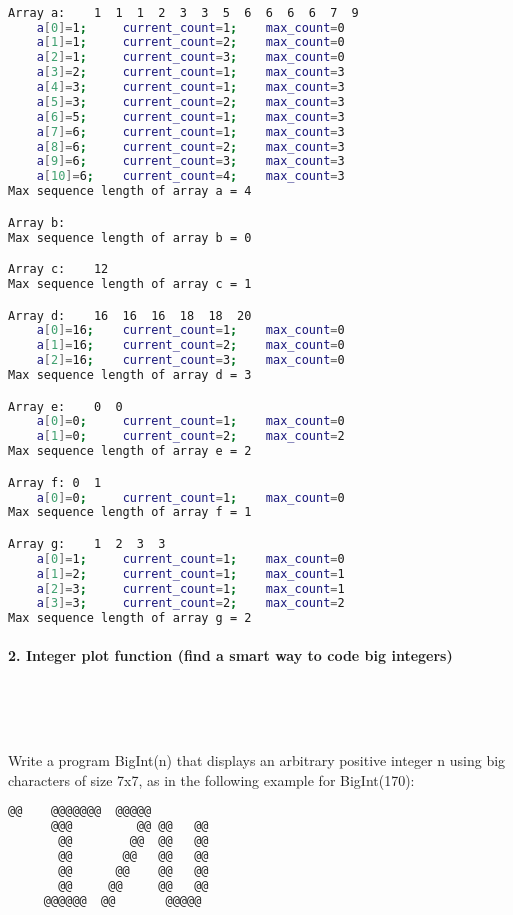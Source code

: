 \documentclass{article}
\begin{document}
	\ttfamily
	\begin{lstlisting}[language=bash]

Array a:    1  1  1  2  3  3  5  6  6  6  6  7  9
    a[0]=1; 	current_count=1; 	max_count=0
    a[1]=1; 	current_count=2; 	max_count=0
    a[2]=1; 	current_count=3; 	max_count=0
    a[3]=2; 	current_count=1; 	max_count=3
    a[4]=3; 	current_count=1; 	max_count=3
    a[5]=3; 	current_count=2; 	max_count=3
    a[6]=5; 	current_count=1; 	max_count=3
    a[7]=6; 	current_count=1; 	max_count=3
    a[8]=6; 	current_count=2; 	max_count=3
    a[9]=6; 	current_count=3; 	max_count=3
    a[10]=6; 	current_count=4; 	max_count=3
Max sequence length of array a = 4

Array b:
Max sequence length of array b = 0

Array c:    12
Max sequence length of array c = 1

Array d:    16  16  16  18  18  20
    a[0]=16; 	current_count=1; 	max_count=0
    a[1]=16; 	current_count=2; 	max_count=0
    a[2]=16; 	current_count=3; 	max_count=0
Max sequence length of array d = 3

Array e:    0  0
    a[0]=0; 	current_count=1; 	max_count=0
    a[1]=0; 	current_count=2; 	max_count=2
Max sequence length of array e = 2

Array f: 0  1
    a[0]=0; 	current_count=1; 	max_count=0
Max sequence length of array f = 1

Array g:    1  2  3  3
    a[0]=1; 	current_count=1; 	max_count=0
    a[1]=2; 	current_count=1; 	max_count=1
    a[2]=3; 	current_count=1; 	max_count=1
    a[3]=3; 	current_count=2; 	max_count=2
Max sequence length of array g = 2

	\end{lstlisting}
	
	


	
	
	\rmfamily
	
	\paragraph{2. Integer plot function (find a smart way to code big integers) }\
	
	\rmfamily\
	
		Write a program BigInt(n) that displays an arbitrary positive integer n using big characters of size 7x7, as in the following example for BigInt(170):
				
	\ttfamily
	\begin{lstlisting}[language=bash]		
	   @@ 	 @@@@@@@  @@@@@  
	  @@@  	      @@ @@   @@ 
	   @@  	     @@  @@   @@ 
	   @@  	    @@   @@   @@ 
	   @@  	   @@    @@   @@ 
	   @@  	  @@     @@   @@ 
	 @@@@@@	 @@       @@@@@  
		 
	\end{lstlisting}
	
\end{document}
